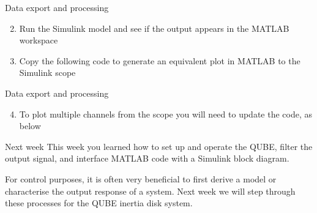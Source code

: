 \documentclass[8pt]{beamer-control}
\begin{document}
\begin{frame}{Data export and processing}
\begin{enumerate}
    \setcounter{enumi}{1}
    \item Run the Simulink model and see if the output appears in the MATLAB workspace
    \item Copy the following code to generate an equivalent plot in MATLAB to the Simulink scope
\end{enumerate}
\end{frame}

\begin{frame}{Data export and processing}
\begin{enumerate}
    \setcounter{enumi}{3}
    \item To plot multiple channels from the scope you will need to update the code, as below
\end{enumerate}
\end{frame}


\begin{frame}{Next week}
This week you learned how to set up and operate the QUBE, filter the output signal, and interface MATLAB code with a Simulink block diagram.
	
For control purposes, it is often very beneficial to first derive a model or characterise the output response of a system. Next week we will step through these processes for the QUBE inertia disk system.
\end{frame}
\end{document}
